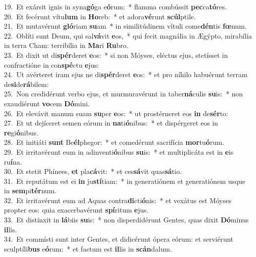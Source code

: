 {19.~}Et exársit ignis in syna\textbf{gó}ga e\textbf{ó}rum:~* flamma combússit \textbf{pec}ca\textbf{tó}res.\\
{20.~}Et fecérunt vítu\textbf{lum} in \textbf{Ho}reb:~* et adora\textbf{vé}runt \textbf{scúl}ptile.\\
{21.~}Et mutavérunt \textbf{gló}riam \textbf{su}am~* in similitúdinem vítuli come\textbf{dén}tis \textbf{fœ}num.\\
{22.~}Oblíti sunt Deum, qui sal\textbf{vá}vit \textbf{e}os,~* qui fecit magnália in Ægýpto, mirabília in terra Cham: terribília in \textbf{Ma}ri \textbf{Ru}bro.\\
{23.~}Et dixit ut di\textbf{spér}deret \textbf{e}os:~* si non Móyses, eléctus ejus, stetísset in confractióne in con\textbf{spé}ctu \textbf{e}jus:\\
{24.~}Ut avérteret iram ejus ne di\textbf{spér}deret \textbf{e}os:~* et pro níhilo habuérunt terram de\textbf{si}de\textbf{rá}bilem:\\
{25.~}Non credidérunt verbo ejus, et murmuravérunt in taber\textbf{ná}culis \textbf{su}is:~* non exaudiérunt \textbf{vo}cem \textbf{Dó}mini.\\
{26.~}Et elevávit manum suam \textbf{su}per \textbf{e}os:~* ut prostérneret eos \textbf{in} de\textbf{sér}to:\\
{27.~}Et ut dejíceret semen eórum in \textbf{na}ti\textbf{ó}nibus:~* et dispérgeret eos in \textbf{re}gi\textbf{ó}nibus.\\
{28.~}Et initiáti \textbf{sunt} Be\textbf{él}phegor:~* et comedérunt sacrifícia \textbf{mor}tu\textbf{ó}rum.\\
{29.~}Et irritavérunt eum in adinventi\textbf{ó}nibus \textbf{su}is:~* et multiplicáta est in \textbf{e}is ru\textbf{í}na.\\
{30.~}Et stetit Phínees, \textbf{et} pla\textbf{cá}vit:~* et ces\textbf{sá}vit quas\textbf{sá}tio.\\
{31.~}Et reputátum est ei \textbf{in} ju\textbf{stí}tiam:~* in generatiónem et generatiónem usque in \textbf{sem}pi\textbf{tér}num.\\
{32.~}Et irritavérunt eum ad Aquas contra\textbf{di}cti\textbf{ó}nis:~* et vexátus est Móyses propter eos: quia exacerbavérunt \textbf{spí}ritum \textbf{e}jus.\\
{33.~}Et distínxit in \textbf{lá}biis \textbf{su}is:~* non disperdidérunt Gentes, quas dixit \textbf{Dó}minus \textbf{il}lis.\\
{34.~}Et commísti sunt inter Gentes, et didicérunt ópera eórum: et serviérunt sculptíli\textbf{bus} e\textbf{ó}rum:~* et factum est \textbf{il}lis in \textbf{scán}dalum.\\
